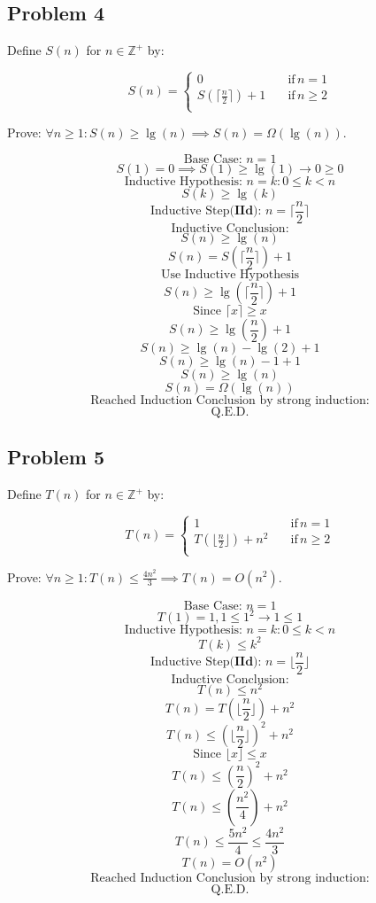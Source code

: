 \documentclass{article}
\begin{document}
\subsection{Problem 4}

Define $S(n)$ for $n \in \mathbb{Z}^+$ by:

\begin{equation*}
S(n)=\begin{cases}
          0 \quad &\text{if} \, n = 1 \\
          S(\lceil \frac{n}{2} \rceil) + 1\quad &\text{if} \, n \ge 2\\
     \end{cases}
\end{equation*}

Prove: $\forall n \ge 1: S(n) \ge \lg(n) \implies S(n) = \Omega(\lg(n))$.

$$\text{Base Case: } n = 1$$
$$S(1) = 0 \implies S(1) \ge \lg(1) \rightarrow 0 \ge 0$$
$$\text{Inductive Hypothesis: }  n = k: 0 \le k < n$$
$$S(k) \ge \lg(k)$$
$$\text{Inductive Step(} \textbf{IId} \text{): } n = \lceil \frac{n}{2} \rceil $$
$$\text{Inductive Conclusion:}$$
$$S(n) \ge \lg(n)$$
$$S(n) = S(\lceil \frac{n}{2} \rceil) + 1$$
$$\text{Use Inductive Hypothesis}$$
$$S(n) \ge \lg(\lceil \frac{n}{2} \rceil) + 1$$
$$\text{Since } \lceil x \rceil \ge x$$
$$S(n) \ge \lg(\frac{n}{2}) + 1$$
$$S(n) \ge \lg(n) - \lg(2) + 1$$
$$S(n) \ge \lg(n) - 1 + 1$$
$$S(n) \ge \lg(n)$$
$$S(n) = \Omega(\lg(n))$$
$$\text{Reached Induction Conclusion by strong induction:}$$
$$\text{Q.E.D.}$$

\subsection{Problem 5}

Define $T(n)$ for $n \in \mathbb{Z}^+$ by:

\begin{equation*}
T(n)=\begin{cases}
          1 \quad &\text{if} \, n = 1 \\
          T(\lfloor \frac{n}{2} \rfloor) + n^2\quad &\text{if} \, n \ge 2\\
     \end{cases}
\end{equation*}

Prove: $\forall n \ge 1: T(n) \le \frac{4n^2}{3} \implies T(n) = O(n^2)$.

$$\text{Base Case: } n = 1$$
$$T(1) = 1, 1 \le 1^2 \rightarrow 1 \le 1$$
$$\text{Inductive Hypothesis: } n = k: 0 \le k < n$$
$$T(k) \le k^2$$
$$\text{Inductive Step(} \textbf{IId} \text{): } n = \lfloor \frac{n}{2} \rfloor $$
$$\text{Inductive Conclusion:}$$
$$T(n) \le n^2$$
$$T(n) = T(\lfloor \frac{n}{2} \rfloor) + n^2 $$
$$T(n) \le (\lfloor \frac{n}{2} \rfloor)^2 + n^2 $$
$$\text{Since }\lfloor x \rfloor \le x$$
$$T(n) \le (\frac{n}{2})^2 + n^2 $$
$$T(n) \le (\frac{n^2}{4}) + n^2 $$
$$T(n) \le \frac{5n^2}{4} \le \frac{4n^2}{3}$$
$$T(n) = O(n^2)$$
$$\text{Reached Induction Conclusion by strong induction:}$$
$$\text{Q.E.D.}$$
\end{document}
